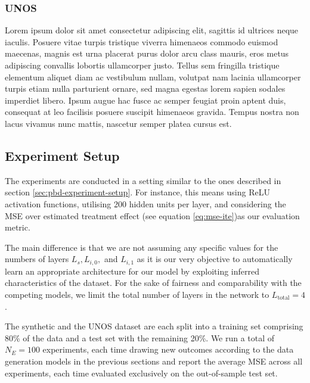 
\subsubsection{UNOS}
Lorem ipsum dolor sit amet consectetur adipiscing elit, sagittis id ultrices neque iaculis. Posuere vitae turpis tristique viverra himenaeos commodo euismod maecenas, magnis est urna placerat purus dolor arcu class mauris, eros metus adipiscing convallis lobortis ullamcorper justo. Tellus sem fringilla tristique elementum aliquet diam ac vestibulum nullam, volutpat nam lacinia ullamcorper turpis etiam nulla parturient ornare, sed magna egestas lorem sapien sodales imperdiet libero. Ipsum augue hac fusce ac semper feugiat proin aptent duis, consequat at leo facilisis posuere suscipit himenaeos gravida. Tempus nostra non lacus vivamus nunc mattis, nascetur semper platea cursus est.

\subsection{Experiment Setup}
The experiments are conducted in a setting similar to the ones described in section \ref{sec:pbd-experiment-setup}. For instance, this means using ReLU activation functions, utilising 200 hidden units per layer, and considering the MSE over estimated treatment effect (see equation \ref{eq:mse-ite})as our evaluation metric. 

The main difference is that we are not assuming any specific values for the numbers of layers $L_s, L_{i,0},$ and $L_{i,1}$ as it is our very objective to automatically learn an appropriate architecture for our model by exploiting inferred characteristics of the dataset. For the sake of fairness and  comparability with the competing models, we limit the total number of layers in the network to $L_{\text{total}} = 4$. 

The synthetic and the UNOS dataset are each split into a training set comprising 80\% of the data and a test set with the remaining 20\%. We run a total of $N_E = 100$ experiments, each time drawing new outcomes according to the data generation models in the previous sections
and report the average MSE across all experiments, each time evaluated exclusively on the out-of-sample test set. 



